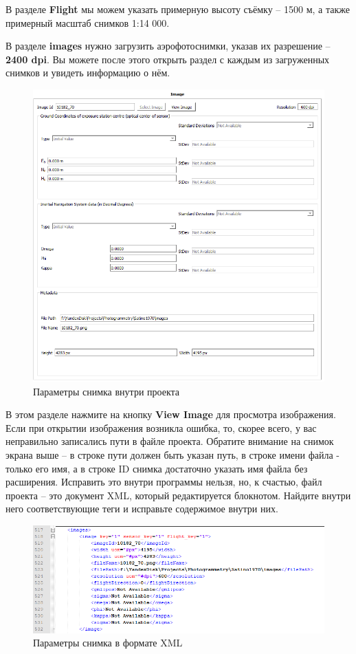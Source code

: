 \documentclass[
  12pt,
]{book}
\begin{document}
В разделе \textbf{Flight} мы можем указать примерную высоту съёмку -- 1500 м, а также примерный масштаб снимков 1:14 000.

В разделе \textbf{images} нужно загрузить аэрофотоснимки, указав их разрешение -- \textbf{2400 dpi}. Вы можете после этого открыть раздел с каждым из загруженных снимков и увидеть информацию о нём.

\begin{figure}
\centering
\includegraphics{images/Ref13/Image_Properties.png}
\caption{Параметры снимка внутри проекта}
\end{figure}

В этом разделе нажмите на кнопку \textbf{View Image} для просмотра изображения. Если при открытии изображения возникла ошибка, то, скорее всего, у вас неправильно записались пути в файле проекта. Обратите внимание на снимок экрана выше -- в строке пути должен быть указан путь, в строке имени файла - только его имя, а в строке ID снимка достаточно указать имя файла без расширения. Исправить это внутри программы нельзя, но, к счастью, файл проекта -- это документ XML, который редактируется блокнотом. Найдите внутри него соответствующие теги и исправьте содержимое внутри них.

\begin{figure}
\centering
\includegraphics{images/Ref13/XML_editing.png}
\caption{Параметры снимка в формате XML}
\end{figure}
\end{document}
